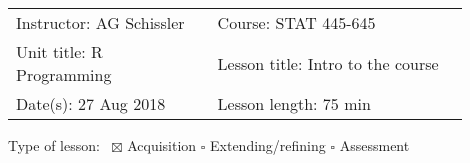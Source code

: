 \documentclass[letterpaper,11pt]{article}
\newcommand\textlcsc[1]{\textsc{\MakeLowercase{#1}}}
\begin{document}

\vspace{5mm}

\begin{tabular}{p{0.4\linewidth} p{0.5\linewidth}}
  Instructor: AG Schissler & Course: STAT 445-645 \\
  Unit title: R Programming & Lesson title: Intro to the course \\
  Date(s): 27 Aug 2018 & Lesson length: 75 min \\
\end{tabular}

\vspace{5mm}
Type of lesson:~ $\boxtimes$ Acquisition \hspace{5mm} $\square$ Extending/refining  \hspace{5mm} $\square$ Assessment

\vspace{5mm}
\end{document}
